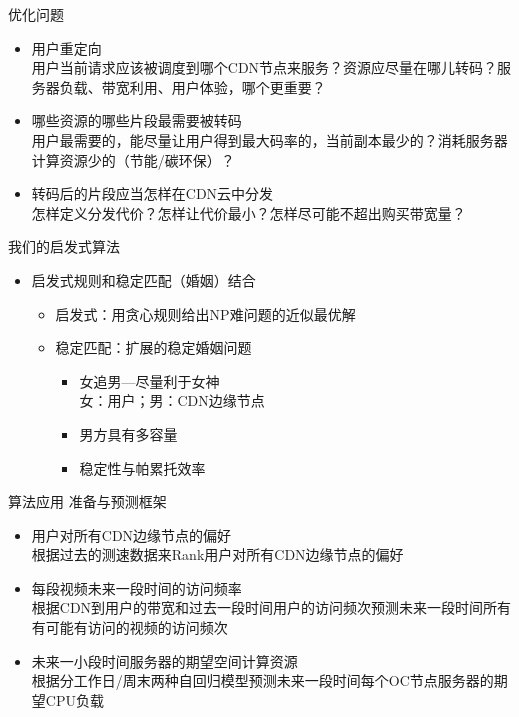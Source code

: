 \documentclass{beamer}
\begin{document}
\begin{frame}{优化问题}
\begin{itemize}
\item 用户重定向\\
用户当前请求应该被调度到哪个CDN节点来服务？资源应尽量在哪儿转码？服务器负载、带宽利用、用户体验，哪个更重要？
\item 哪些资源的哪些片段最需要被转码\\
用户最需要的，能尽量让用户得到最大码率的，当前副本最少的？消耗服务器计算资源少的（节能/碳环保）？
\item 转码后的片段应当怎样在CDN云中分发\\
怎样定义分发代价？怎样让代价最小？怎样尽可能不超出购买带宽量？
\end{itemize}
\end{frame}
\begin{frame}{我们的启发式算法}
\begin{itemize}
\item 启发式规则和稳定匹配（婚姻）结合
	\begin{itemize}
		\item 启发式：用贪心规则给出NP难问题的近似最优解
		\item 稳定匹配：扩展的稳定婚姻问题\\
			\begin{itemize}
					\item 女追男---尽量利于女神\\
						女：用户；男：CDN边缘节点
					\item 男方具有多容量
					\item 稳定性与帕累托效率
			\end{itemize}
	\end{itemize}
\end{itemize}
\end{frame}
\begin{frame}{算法应用}
准备与预测框架\\
\begin{itemize}
\item 用户对所有CDN边缘节点的偏好\\
根据过去的测速数据来Rank用户对所有CDN边缘节点的偏好
\item 每段视频未来一段时间的访问频率\\
根据CDN到用户的带宽和过去一段时间用户的访问频次预测未来一段时间所有有可能有访问的视频的访问频次
\item 未来一小段时间服务器的期望空间计算资源\\
根据分工作日/周末两种自回归模型预测未来一段时间每个OC节点服务器的期望CPU负载
\end{itemize}
\end{frame}
\end{document}

